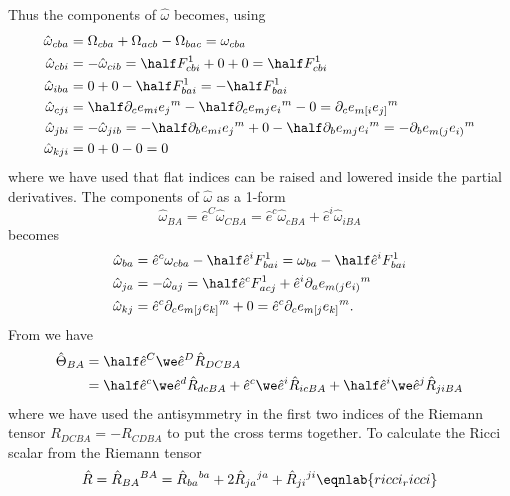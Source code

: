%
Thus the components of $\hat\omega$ becomes, using 
\begin{align}
\hat\omega_{cba} &= \Omega_{cba} + \Omega_{acb} - \Omega_{bac} = \omega_{cba}\nonumber\\
\hat\omega_{cbi} &= - \hat\omega_{cib} = \half F^1_{cbi}+0+0 = \half F^1_{cbi}\nonumber\\ 
\hat\omega_{iba} &= 0+0-\half F^1_{bai} = -\half F^1_{bai}\nonumber\\ 
\hat\omega_{cji} &= \half \partial_ce_{mi}e{_j}^m - \half \partial_ce_{mj}e{_i}^m - 0 = \partial_ce_{m[i}e{_{j]}}^m\nonumber\\ 
\hat\omega_{jbi} &= - \hat\omega_{jib} = - \half \partial_be_{mi}e{_j}^m + 0 - \half \partial_be_{mj}e{_i}^m = - \partial_be_{m(j}e{_{i)}}^m \nonumber\\ 
\hat\omega_{kji} &= 0+0-0 = 0 
\end{align}
where we have used that flat indices can be raised and lowered inside the partial derivatives.
The components of $\hat\omega$ as a 1-form 
\begin{equation}
\hat\omega_{BA}=\hat e^C\hat\omega_{CBA} = \hat e^c\hat\omega_{cBA} + \hat e^i\hat\omega_{iBA} 
\end{equation}
becomes
\begin{align}
\hat\omega_{ba} &= \hat e^c\omega_{cba} - \half\hat e^i F^1_{bai} = \omega_{ba} - \half\hat e^i F^1_{bai}\nonumber\\ 
\hat\omega_{ja} &= -\hat\omega_{aj} = \half \hat e^c F^1_{acj} + \hat e^i\partial_a e_{m(j}e{_{i)}}^m\nonumber\\
\hat\omega_{kj} &= \hat e^c\partial_ce_{m[j}e{_{k]}}^m + 0 = \hat e^c\partial_ce_{m[j}e{_{k]}}^m.
\end{align}
%
From  we have
\begin{align}
\hat\Theta_{BA} &= \half\hat e^C\we\hat e^D\hat R_{DCBA}\nonumber\\ 
&= \half\hat e^c\we\hat e^d\hat R_{dcBA} + \hat e^c\we\hat e^i\hat R_{icBA} + \half\hat e^i\we\hat e^j\hat R_{jiBA}
\end{align}
where we have used the antisymmetry in the first two indices of the Riemann tensor $R_{DCBA} = -R_{CDBA}$ to put the cross terms together.
%
To calculate the Ricci scalar from the Riemann tensor
\begin{equation}
\hat R = \hat R{_{BA}}^{BA} = \hat R{_{ba}}^{ba} + 2\hat R{_{ja}}^{ja} + \hat R{_{ji}}^{ji}
\eqnlab{ricci_ricci}
\end{equation}
